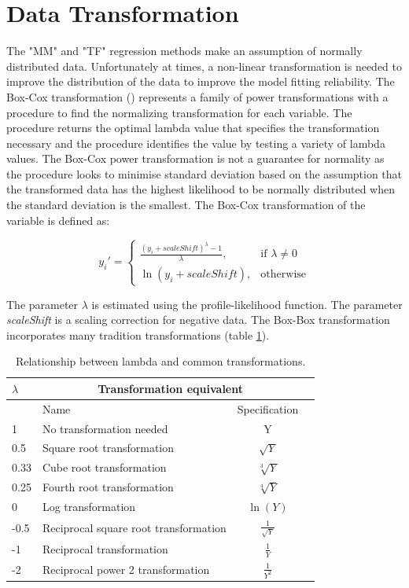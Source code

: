 \documentclass[12pt,a4paper]{article}
\begin{document}
\section{Data Transformation}
\label{section:transformation}
The "MM" and "TF" regression methods make an assumption of normally distributed data. Unfortunately at times, a non-linear transformation is needed to improve the distribution of the data to improve the model fitting reliability. 
The Box-Cox transformation (\cite{BoxCox}) represents a family of power transformations with a procedure to find the normalizing transformation for each variable. The procedure returns the optimal lambda value that specifies the transformation necessary and the procedure identifies the value by testing a variety of lambda values. The Box-Cox power transformation is not a guarantee for normality as the procedure looks to minimise standard deviation based on the assumption that the transformed data has the highest likelihood to be normally distributed when the standard deviation is the smallest. 
The Box-Cox transformation of the variable is defined as:

\begin{equation}
  y_i'=\begin{cases}
    \frac{(y_i + scaleShift)^\lambda - 1}{\lambda}, & \text{if $\lambda \neq 0$}\\
    \ln(y_i + scaleShift), & \text{otherwise}
  \end{cases}
\end{equation}

The parameter $\lambda$ is estimated using the profile-likelihood function. The parameter \textit{scaleShift} is a scaling correction for negative data.
The Box-Box transformation incorporates many tradition transformations (table \ref{table:tr1}). 
\begin{table}[!h]
\begin{center}
\begin{tabular}{| l | l | c | c |}
  \hline
$\lambda$&\multicolumn{2}{|c|}{Transformation equivalent}\\\hline
&Name&Specification\\\hline
1&No transformation needed&Y\\
0.5&Square root transformation&$\sqrt{Y}$\\
0.33&Cube root transformation&$\sqrt[3]{Y}$\\
0.25&Fourth root transformation&$\sqrt[4]{Y}$\\
0&Log transformation&$\ln(Y)$\\
-0.5&Reciprocal square root transformation&$\frac{1}{\sqrt{Y}}$\\
-1&Reciprocal transformation&$\frac{1}{Y}$\\
-2&Reciprocal power 2 transformation&$\frac{1}{Y^2}$\\
\hline  
\end{tabular}
\caption{Relationship between lambda and common transformations.}\label{table:tr1}
\end{center}
\end{table}
\end{document}
